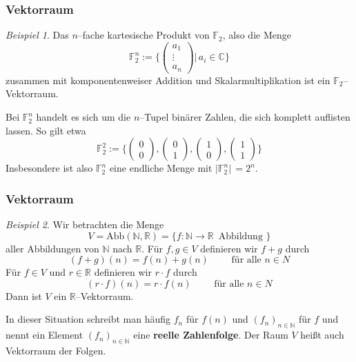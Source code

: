 \documentclass[hyperref={pdfpagelabels=false}]{beamer}
\theoremstyle{plain}%
\theoremstyle{definition}
\theoremstyle{remark}
\newtheorem*{beispiel}{Beispiel}
\def \R{\mathbb R}
\def \N{\mathbb N}
\begin{document}
\begin{frame}
\frametitle{Vektorraum}

\begin{beispiel} Das $n$--fache kartesische Produkt von $\mathbb F_2$, also die Menge
  	$$ \mathbb F_2^n := \{ \left( \begin{matrix} a_1 \\ \vdots \\ a_n 
     	\end{matrix} \right) \vert \, a_i \in \mathbb C \} $$
zusammen mit komponentenweiser Addition und Skalarmultiplikation ist ein 
$\mathbb F_2$--Vektorraum.  \pause

Bei $\mathbb F_2^n$ handelt es sich um die $n$--Tupel binärer Zahlen, die sich 
komplett auflisten lassen. So gilt etwa 
  	$$ \mathbb F_2^2 := \{ \left( \begin{matrix} 0 \\ 0 \end{matrix} \right),
   	\left( \begin{matrix} 0 \\ 1 \end{matrix} \right), 
   	\left( \begin{matrix} 1 \\ 0 \end{matrix} \right),
   	\left( \begin{matrix} 1 \\ 1 \end{matrix} \right) \} $$ \pause 
Insbesondere ist also $\mathbb F_2^n$ eine endliche Menge mit $ \vert \mathbb F_2^n \vert \, = 2^n $.

\end{beispiel}

\end{frame}

\begin{frame}
\frametitle{Vektorraum}

\begin{beispiel} 
Wir betrachten die Menge 
	$$ V = \mathrm{Abb}(\N, \R) = \{ f: \N \longrightarrow \R \, \text{ Abbildung }\} $$
aller Abbildungen von $\N$ nach $\R$. \pause  Für $f, g \in V$ definieren wir $f+g$ durch 
	$$ (f+g)(n) = f(n) + g(n) \qquad \text{ für alle } n \in N $$ \pause
Für $f \in V$ und $r \in \R$ definieren wir $r \cdot f$ durch
	$$ (r \cdot f)(n) = r \cdot f(n) \qquad \text{ für alle } n \in N $$
Dann ist $V$ ein $\R$--Vektorraum. 

\pause 
In dieser Situation schreibt man häufig $f_n$ für $f(n)$ und $\left(f_n\right)_{n \in \N}$ für $f$ und nennt 
ein Element $\left(f_n\right)_{n \in \N}$ eine \textbf{reelle Zahlenfolge}. Der Raum $V$ heißt auch 
Vektorraum der Folgen.
\end{beispiel}

\end{frame}
\end{document}
